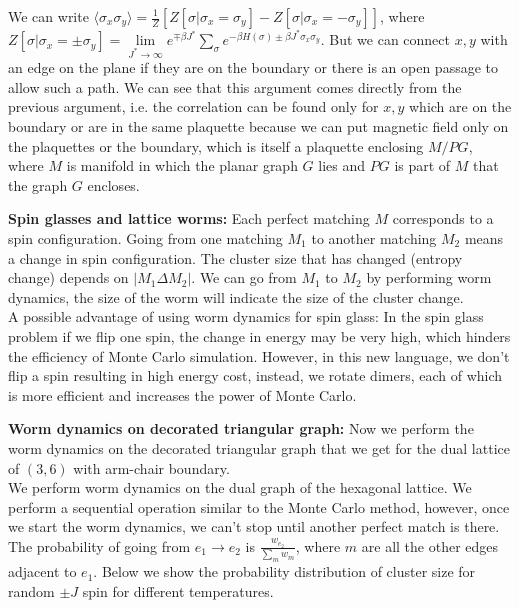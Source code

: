 \documentclass{article}
\begin{document}
	We can write $\langle \sigma_x \sigma_y\rangle=\frac{1}{Z}[Z[\sigma| \sigma_x=\sigma_y]-Z[\sigma| \sigma_x=-\sigma_y]]$, where $Z[\sigma| \sigma_x=\pm \sigma_y]=\lim \limits_{J^* \to \infty} e^{\mp\beta J^*}\sum_{\sigma} e^{-\beta H(\sigma)\pm\beta J^*\sigma_x\sigma_y}$. But we can connect $x,y$ with an edge on the plane if they are on the boundary or there is an open passage to allow such a path. We can see that this argument comes directly from the previous argument, i.e. the correlation can be found only for $x,y$ which are on the boundary or are in the same plaquette because we can put magnetic field only on the plaquettes or the boundary, which is itself a plaquette enclosing $M/PG$, where $M$ is manifold in which the planar graph $G$ lies and $PG$ is part of $M$ that the graph $G$ encloses. \\
	
	\vspace{1 cm}
	
	\textbf{Spin glasses and lattice worms:} Each perfect matching $M$ corresponds to a spin configuration. Going from one matching $M_1$ to another matching $M_2$ means a change in spin configuration. The cluster size that has changed (entropy change) depends on $|M_1\Delta M_2|$. We can go from $M_1$ to $M_2$ by performing worm dynamics, the size of the worm will indicate the size of the cluster change. \\
	
	A possible advantage of using worm dynamics for spin glass: In the spin glass problem if we flip one spin, the change in energy may be very high, which hinders the efficiency of Monte Carlo simulation. However, in this new language, we don't flip a spin resulting in high energy cost, instead, we rotate dimers, each of which is more efficient and increases the power of Monte Carlo. \\
	
	\vspace{0.5 cm}
	
	\textbf{Worm dynamics on decorated triangular graph:} Now we perform the worm dynamics on the decorated triangular graph that we get for the dual lattice of $(3,6)$ with arm-chair boundary. \\
	
	We perform worm dynamics on the dual graph of the hexagonal lattice. We perform a sequential operation similar to the Monte Carlo method, however, once we start the worm dynamics, we can't stop until another perfect match is there. The probability of going from $e_1 \to e_2$ is $\frac{w_{e_2}}{\sum_m w_{m}}$, where $m$ are all the other edges adjacent to $e_1$. Below we show the probability distribution of cluster size for random $\pm J$ spin for different temperatures.\\
	
\end{document}
